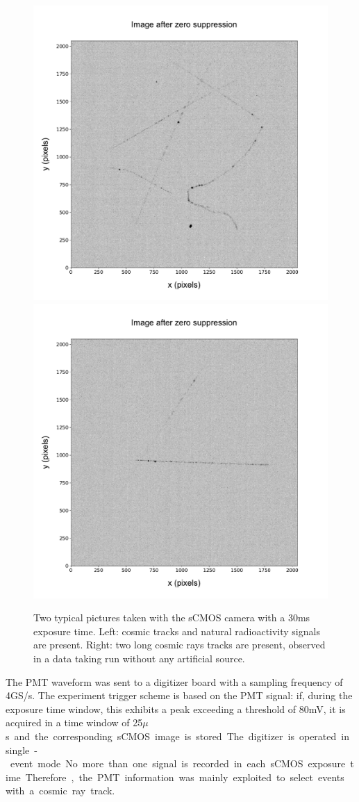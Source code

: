 \documentclass[12pt]{iopart}
\begin{document}
\begin{figure}[ht]
  \begin{center}
    \includegraphics[width=0.49\linewidth]{figures/pic_run02317_ev8_oriIma_paper}
    \includegraphics[width=0.49\linewidth]{figures/pic_run02156_ev527_oriIma_paper}
    \caption{Two typical pictures taken with the sCMOS camera with a
      30\unit{ms} exposure time. Left: cosmic tracks and natural
      radioactivity signals are present. Right: two long cosmic rays
      tracks are present, observed in a data taking run without any artificial source.
      \label{fig:typicalimage1}}
  \end{center}
\end{figure}

The PMT waveform was sent to a digitizer board with a sampling
frequency of 4\unit{GS/s}. The experiment trigger scheme is based on
the PMT signal: if, during the exposure time window, this exhibits a
peak exceeding a threshold of 80\unit{mV}, it is acquired in a time
window of 25\unit{$\mu$s} and the corresponding sCMOS image is stored.
The digitizer is operated in single-event mode. No more than one
signal is recorded in each sCMOS exposure time. Therefore, the PMT
information was mainly exploited to select events with a cosmic ray
track.
\end{document}
